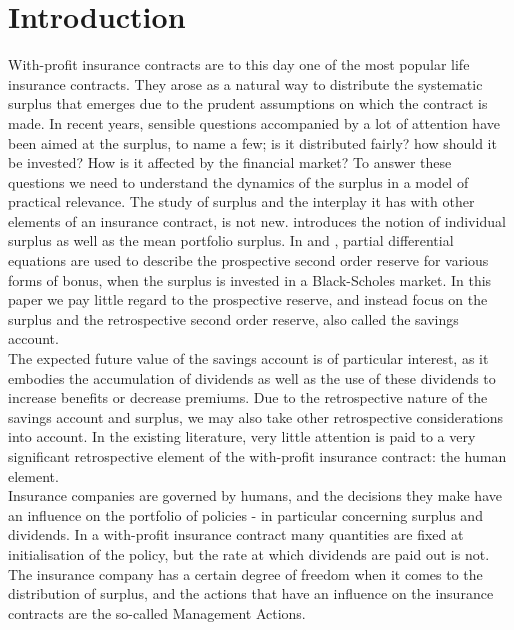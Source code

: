 \documentclass[12pt]{article}
\theoremstyle{my_thm}
\begin{document}
\section{Introduction}
With-profit insurance contracts are to this day one of the most popular life insurance contracts. They arose as a natural way to distribute the systematic surplus that emerges due to the prudent assumptions on which the contract is made. In recent years, sensible questions accompanied by a lot of attention have been aimed at the surplus, to name a few; is it distributed fairly? how should it be invested? How is it affected by the financial market? To answer these questions we need to understand the dynamics of the surplus in a model of practical relevance. The study of surplus and the interplay it has with other elements of an insurance contract, is not new. \citet{NorbergB} introduces the notion of individual surplus as well as the mean portfolio surplus. In \citet{Steffensen0} and \citet{Steffensen1}, partial differential equations are used to describe the prospective second order reserve for various forms of bonus, when the surplus is invested in a Black-Scholes market. In this paper we pay little regard to the prospective reserve, and instead focus on the surplus and the retrospective second order reserve, also called the savings account. 
\\[12pt]
The expected future value of the savings account is of particular interest, as it embodies the accumulation of dividends as well as the use of these dividends to increase benefits or decrease premiums. Due to the retrospective nature of the savings account and surplus, we may also take other retrospective considerations into account. In the existing literature, very little attention is paid to a very significant retrospective element of the with-profit insurance contract: the human element.
\\[12pt]
Insurance companies are governed by humans, and the decisions they make have an influence on the portfolio of policies - in particular concerning surplus and dividends. In a with-profit insurance contract many quantities are fixed at initialisation of the policy, but the rate at which dividends are paid out is not. The insurance company has a certain degree of freedom when it comes to the distribution of surplus, and the actions that have an influence on the insurance contracts are the so-called Management Actions.
\end{document}
